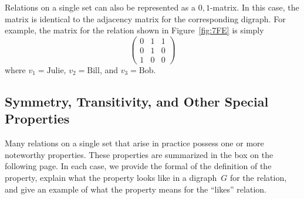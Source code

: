 Relations on a single set can also be represented as a $0, 1$-matrix.
In this case, the matrix is identical to the adjacency matrix for the
corresponding digraph.  For example, the matrix for the relation shown
in Figure~\ref{fig:7FE} is simply
\begin{equation*}
    \begin{pmatrix}
        0 & 1 & 1 \\
        0 & 1 & 0 \\
        1 & 0 & 0
    \end{pmatrix}
\end{equation*}
where $v_1 = \text{Julie}$, $v_2 = \text{Bill}$, and $v_3 =
\text{Bob}$.

\subsection{Symmetry, Transitivity, and Other Special Properties}

Many relations on a single set that arise in practice possess one or
more noteworthy properties.  These properties are summarized in the
box on the following page.  In each case, we provide the formal of the
definition of the property, explain what the property looks like in a
digraph~$G$ for the relation, and give an example of what the property
means for the ``likes'' relation.

